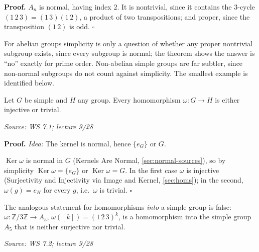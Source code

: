 \documentclass[11pt]{report}
\renewenvironment{proof}[1][Proof]{\noindent\textbf{#1.} }{\hfill$\square$\par\vspace{5pt}}
\newcommand{\srcline}[1]{\par\hfill{\footnotesize\textit{Source: #1}}}
\begin{document}
\begin{proof}
$A_n$ is normal, having index $2$. It is nontrivial, since it contains the $3$-cycle $(1\,2\,3) = (1\,3)(1\,2)$, a product of two transpositions; and proper, since the transposition $(1\,2)$ is odd.
\end{proof}

\begin{rembox}\label{rem:where-interesting-simple-groups}
For abelian groups simplicity is only a question of whether any proper nontrivial subgroup exists, since every subgroup is normal; the theorem shows the answer is ``no'' exactly for prime order. Non-abelian simple groups are far subtler, since non-normal subgroups do not count against simplicity. The smallest example is identified below.
\end{rembox}

\begin{propbox}\label{prop:homomorphisms-out-simple-group}
Let $G$ be simple and $H$ any group. Every homomorphism $\omega: G \to H$ is either injective or trivial.
\srcline{WS 7.1; lecture 9/28}
\end{propbox}

\begin{proof}
\textit{Idea:} The kernel is normal, hence $\{e_G\}$ or $G$.\par
$\operatorname{Ker}\omega$ is normal in $G$ (Kernels Are Normal, \ref{sec:normal-sources}), so by simplicity $\operatorname{Ker}\omega = \{e_G\}$ or $\operatorname{Ker}\omega = G$. In the first case $\omega$ is injective (Surjectivity and Injectivity via Image and Kernel, \ref{sec:homs}); in the second, $\omega(g) = e_H$ for every $g$, i.e.\ $\omega$ is trivial.
\end{proof}

\begin{propbox}\label{prop:homomorphisms-into-simple-group}
The analogous statement for homomorphisms \emph{into} a simple group is false: $\omega: \mathbb{Z}/3\mathbb{Z} \to A_5$, $\omega([k]) = (1\,2\,3)^k$, is a homomorphism into the simple group $A_5$ that is neither surjective nor trivial.
\srcline{WS 7.2; lecture 9/28}
\end{propbox}
\end{document}
